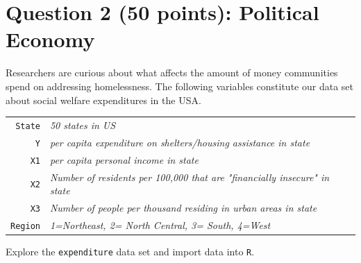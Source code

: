 \documentclass[12pt,letterpaper]{article}
\begin{document}
	\newpage
	
	\section*{Question 2 (50 points): Political Economy}
	
	\noindent Researchers are curious about what affects the amount of money communities spend on addressing homelessness. The following variables constitute our data set about social welfare expenditures in the USA. \\
	
	\vspace{.5cm}
		
	\begin{tabular}{r|l}
		\texttt{State} &\emph{50 states in US} \\
		\texttt{Y} & \emph{per capita expenditure on shelters/housing assistance in state}\\
		\texttt{X1} &\emph{per capita personal income in state} \\
		\texttt{X2} &  \emph{Number of residents per 100,000 that are "financially insecure" in state}\\
		\texttt{X3} &  \emph{Number of people per thousand residing in urban areas in state} \\
		\texttt{Region} &  \emph{1=Northeast, 2= North Central, 3= South, 4=West} \\
	\end{tabular}
	
	\vspace{.5cm}
	
	\noindent Explore the \texttt{expenditure} data set and import data into \texttt{R}.
	
	\vspace{.5cm}
	
	  
	
	\vspace{.5cm}
	
	\newpage
	
\end{document}
